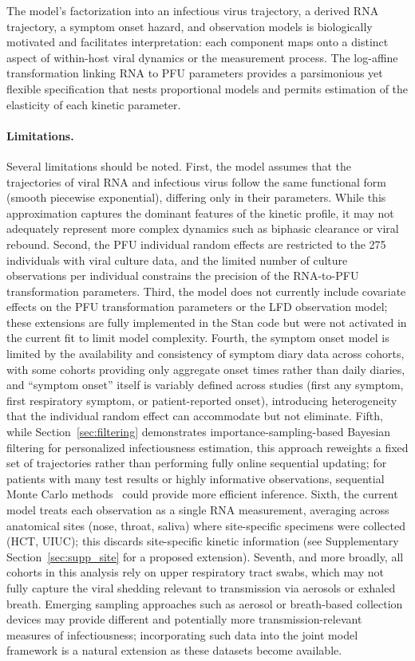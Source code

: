 \documentclass[12pt]{article}
\begin{document}
The model's factorization into an infectious virus trajectory, a derived RNA trajectory, a symptom onset hazard, and observation models is biologically motivated and facilitates interpretation: each component maps onto a distinct aspect of within-host viral dynamics or the measurement process. The log-affine transformation linking RNA to PFU parameters provides a parsimonious yet flexible specification that nests proportional models and permits estimation of the elasticity of each kinetic parameter.

\paragraph{Limitations.} Several limitations should be noted. First, the model assumes that the trajectories of viral RNA and infectious virus follow the same functional form (smooth piecewise exponential), differing only in their parameters. While this approximation captures the dominant features of the kinetic profile, it may not adequately represent more complex dynamics such as biphasic clearance or viral rebound. Second, the PFU individual random effects are restricted to the 275 individuals with viral culture data, and the limited number of culture observations per individual constrains the precision of the RNA-to-PFU transformation parameters. Third, the model does not currently include covariate effects on the PFU transformation parameters or the LFD observation model; these extensions are fully implemented in the Stan code but were not activated in the current fit to limit model complexity. Fourth, the symptom onset model is limited by the availability and consistency of symptom diary data across cohorts, with some cohorts providing only aggregate onset times rather than daily diaries, and ``symptom onset'' itself is variably defined across studies (first any symptom, first respiratory symptom, or patient-reported onset), introducing heterogeneity that the individual random effect can accommodate but not eliminate. Fifth, while Section~\ref{sec:filtering} demonstrates importance-sampling-based Bayesian filtering for personalized infectiousness estimation, this approach reweights a fixed set of trajectories rather than performing fully online sequential updating; for patients with many test results or highly informative observations, sequential Monte Carlo methods~\cite{doucet2000sequential} could provide more efficient inference. Sixth, the current model treats each observation as a single RNA measurement, averaging across anatomical sites (nose, throat, saliva) where site-specific specimens were collected (HCT, UIUC); this discards site-specific kinetic information (see Supplementary Section~\ref{sec:supp_site} for a proposed extension). Seventh, and more broadly, all cohorts in this analysis rely on upper respiratory tract swabs, which may not fully capture the viral shedding relevant to transmission via aerosols or exhaled breath. Emerging sampling approaches such as aerosol or breath-based collection devices may provide different and potentially more transmission-relevant measures of infectiousness; incorporating such data into the joint model framework is a natural extension as these datasets become available.
\end{document}
